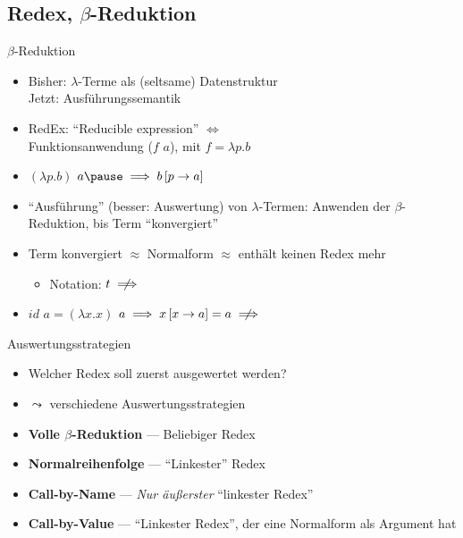 \documentclass{beamer}
\begin{document}
\subsection{Redex, $\beta$-Reduktion}

\begin{frame}{$\beta$-Reduktion}
	\begin{itemize}
		\item Bisher: $\lambda$-Terme als (seltsame) Datenstruktur\\
		      Jetzt: Ausführungssemantik
		\pause
		\item RedEx: \enquote{Reducible expression} $\Leftrightarrow$\\
		      Funktionsanwendung ($f$ $a$), mit $f = \lambda{}p.b$
	      \item $(\lambda{}p.b)$ $a\pause \implies b\left[p \to a\right]$
		\pause
		\item \enquote{Ausführung} (besser: Auswertung) von $\lambda$-Termen: Anwenden der $\beta$-Reduktion, bis Term \enquote{konvergiert}
		\item Term konvergiert $\approx$ Normalform $\approx$ enthält keinen Redex mehr
		\begin{itemize}
			\item Notation: $t \centernot\implies$
		\end{itemize}
		\pause
		\item $id$ $a = (\lambda{}x.x)$ $a \implies x\left[x \to a\right] = a \centernot\implies$
	\end{itemize}
\end{frame}

\begin{frame}{Auswertungsstrategien}
	\begin{itemize}
		\item Welcher Redex soll zuerst ausgewertet werden?
		\item $\leadsto$ verschiedene Auswertungsstrategien
	\end{itemize}
	\pause
	\vspace{1cm}
	\begin{itemize}
		\item \textbf{Volle $\beta$-Reduktion} --- Beliebiger Redex
		\item \textbf{Normalreihenfolge} --- \enquote{Linkester} Redex
		\pause
		\item \textbf{Call-by-Name} --- \emph{Nur äußerster} \enquote{linkester Redex}
		\item \textbf{Call-by-Value} --- \enquote{Linkester Redex}, der eine Normalform als Argument hat
	\end{itemize}
\end{frame}
\end{document}
